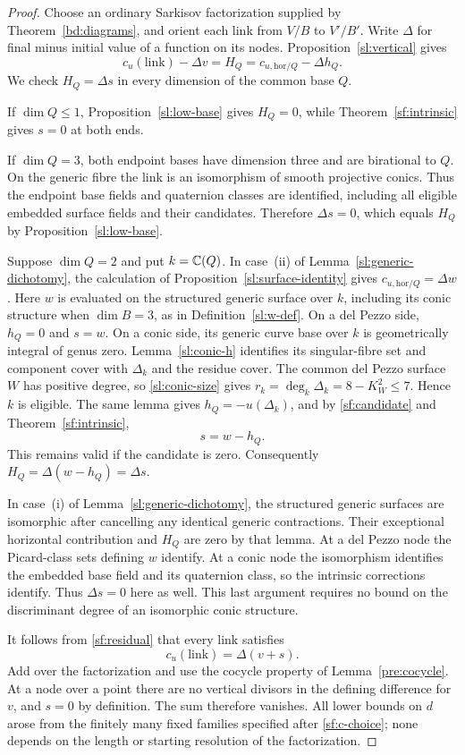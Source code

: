 \begin{proof}
Choose an ordinary Sarkisov factorization supplied by
Theorem~\ref{bd:diagrams}, and orient each link from
$V/B$ to $V'/B'$.  Write $\Delta$ for final minus initial value of
a function on its nodes.  Proposition~\ref{sl:vertical} gives
\begin{equation}\label{sf:residual}
 c_u(\text{link})-\Delta v
 =H_Q=c_{u,\mathrm{hor}/Q}-\Delta h_Q.
\end{equation}
We check $H_Q=\Delta s$ in every dimension of the common base $Q$.

If $\dim Q\leq1$, Proposition~\ref{sl:low-base} gives $H_Q=0$, while
Theorem~\ref{sf:intrinsic} gives $s=0$ at both ends.

If $\dim Q=3$, both endpoint bases have dimension three and are
birational to $Q$.  On the generic fibre the link is an isomorphism
of smooth projective conics.  Thus the endpoint base fields and
quaternion classes are identified, including all eligible embedded
surface fields and their candidates.  Therefore $\Delta s=0$,
which equals $H_Q$ by Proposition~\ref{sl:low-base}.

Suppose $\dim Q=2$ and put $k=\mathbb C(Q)$.  In case~\textup{(ii)} of
Lemma~\ref{sl:generic-dichotomy}, the calculation of
Proposition~\ref{sl:surface-identity} gives
$c_{u,\mathrm{hor}/Q}=\Delta w$.  Here $w$ is evaluated on the
structured generic surface over $k$, including its conic structure
when $\dim B=3$, as in Definition~\ref{sl:w-def}.
On a del Pezzo side,
$h_Q=0$ and $s=w$.  On a conic side, its generic curve base over
$k$ is geometrically integral of genus zero.  Lemma~\ref{sl:conic-h}
identifies its singular-fibre set and component cover with
$\Delta_k$ and the residue cover.  The common del Pezzo surface $W$
has positive degree, so \eqref{sl:conic-size} gives
$r_k=\deg_k\Delta_k=8-K_W^2\leq7$.  Hence $k$ is eligible.
The same lemma gives $h_Q=-u(\Delta_k)$, and by
\eqref{sf:candidate} and Theorem~\ref{sf:intrinsic},
\[
                         s=w-h_Q.
\]
This remains valid if the candidate is zero.  Consequently
$H_Q=\Delta(w-h_Q)=\Delta s$.

In case~\textup{(i)} of Lemma~\ref{sl:generic-dichotomy}, the
structured generic surfaces are isomorphic after cancelling any
identical generic contractions.  Their exceptional horizontal
contribution and $H_Q$ are zero by that lemma.  At a
del Pezzo node the Picard-class sets defining $w$ identify.  At a
conic node the isomorphism identifies the embedded base field
and its quaternion class, so the intrinsic corrections identify.
Thus $\Delta s=0$ here as well.  This last argument requires no
bound on the discriminant degree of an isomorphic conic
structure.

It follows from \eqref{sf:residual} that every link satisfies
\[
                       c_u(\text{link})=\Delta(v+s).
\]
Add over the factorization and use the cocycle property
of Lemma~\ref{pre:cocycle}.  At a node over a point there
are no vertical divisors in the defining difference for $v$,
and $s=0$ by definition.  The sum therefore vanishes.  All lower
bounds on $d$ arose from the finitely many fixed families specified
after \eqref{sf:c-choice}; none depends on the length or starting
resolution of the factorization.
\end{proof}
